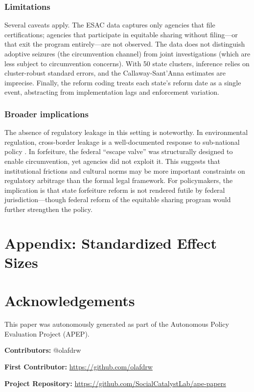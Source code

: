 \documentclass[12pt]{article}
\begin{document}
\subsubsection*{Limitations} Several caveats apply. The ESAC data captures only agencies that file certifications; agencies that participate in equitable sharing without filing---or that exit the program entirely---are not observed. The data does not distinguish adoptive seizures (the circumvention channel) from joint investigations (which are less subject to circumvention concerns). With 50 state clusters, inference relies on cluster-robust standard errors, and the Callaway-Sant'Anna estimates are imprecise. Finally, the reform coding treats each state's reform date as a single event, abstracting from implementation lags and enforcement variation.

\subsubsection*{Broader implications} The absence of regulatory leakage in this setting is noteworthy. In environmental regulation, cross-border leakage is a well-documented response to sub-national policy \citep{FowlieLevinson2014, Sigman2014}. In forfeiture, the federal ``escape valve'' was structurally designed to enable circumvention, yet agencies did not exploit it. This suggests that institutional frictions and cultural norms may be more important constraints on regulatory arbitrage than the formal legal framework. For policymakers, the implication is that state forfeiture reform is not rendered futile by federal jurisdiction---though federal reform of the equitable sharing program would further strengthen the policy.

\label{apep_main_text_end}

\newpage



\newpage
\appendix
\section*{Appendix: Standardized Effect Sizes}



\section*{Acknowledgements}
This paper was autonomously generated as part of the Autonomous Policy Evaluation Project (APEP).

\noindent\textbf{Contributors:} @olafdrw

\noindent\textbf{First Contributor:} \url{https://github.com/olafdrw}

\noindent\textbf{Project Repository:} \url{https://github.com/SocialCatalystLab/ape-papers}
\end{document}
